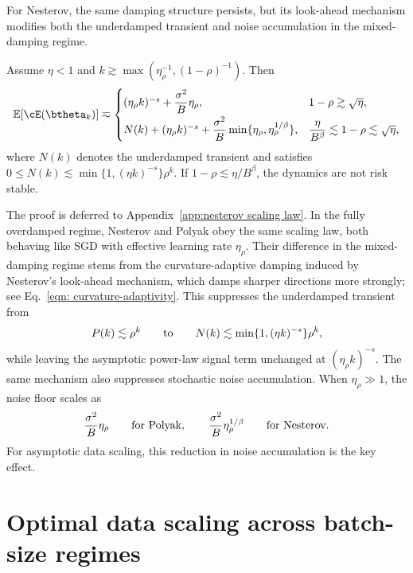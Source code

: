 \documentclass[11pt]{article}
\begin{document}
For Nesterov, the same damping structure persists, but its look-ahead mechanism modifies both the underdamped transient and noise accumulation in the mixed-damping regime.

\begin{highlightedtheorem}
\begin{theorem}
\label{thm:nesterov scaling law}
\normalfont
Assume \(\eta<1\) and \(k\gtrsim\max(\eta^{-1}_\rho,(1-\rho)^{-1})\). Then
\begin{equation}
\label{eq:nag-loss-scaling}
\mathbb E[\cE(\btheta_k)]\eqsim
\begin{cases}
(\eta_\rho k)^{-s}+\dfrac{\sigma^2}{B}\eta_\rho, & 1-\rho\gtrsim\sqrt{\eta},\\[2mm]
N(k)+(\eta_\rho k)^{-s}+\dfrac{\sigma^2}{B}\min\{\eta_\rho,\eta_\rho^{1/\beta}\}, & \dfrac{\eta}{B^\beta}\lesssim1-\rho\lesssim\sqrt{\eta},
\end{cases}
\end{equation}
where \(N(k)\) denotes the underdamped transient and satisfies \(0\leq N(k)\lesssim\min\{1,(\eta k)^{-s}\}\rho^k\). If \(1-\rho\lesssim\eta/B^\beta\), the dynamics are not risk stable.
\end{theorem}
\end{highlightedtheorem}

The proof is deferred to Appendix~\ref{app:nesterov scaling law}.
In the fully overdamped regime, Nesterov and Polyak obey the same scaling law, both behaving like SGD with effective learning rate \(\eta_\rho\). Their difference in the mixed-damping regime stems from the curvature-adaptive damping induced by Nesterov's look-ahead mechanism, which damps sharper directions more strongly; see Eq.~\eqref{eqn: curvature-adaptivity}. This suppresses the underdamped transient from
\[
P(k)\lesssim\rho^k
\qquad\textnormal{to}\qquad
N(k)\lesssim\min\{1,(\eta k)^{-s}\}\rho^k,
\]
while leaving the asymptotic power-law signal term unchanged at \((\eta_\rho k)^{-s}\). The same mechanism also suppresses stochastic noise accumulation. When \(\eta_\rho\gg1\), the noise floor scales as
\[
\frac{\sigma^2}{B}\eta_\rho
\qquad\textnormal{for Polyak},\qquad
\frac{\sigma^2}{B}\eta_\rho^{1/\beta}
\qquad\textnormal{for Nesterov}.
\]
For asymptotic data scaling, this reduction in noise accumulation is the key effect.


\section{Optimal data scaling across batch-size regimes}
\label{sec:data-scaling}
\end{document}
